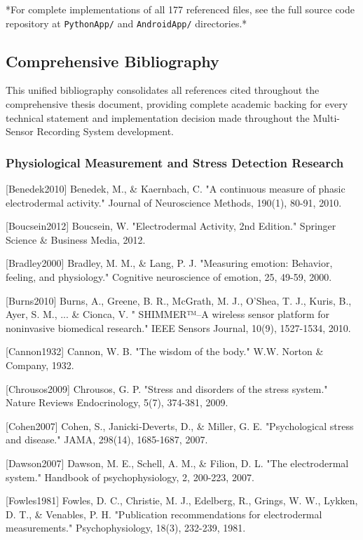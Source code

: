 \documentclass[12pt,a4paper]{report}
\begin{document}
{{*For complete implementations of all 177 referenced files, see the full source code repository at \texttt{PythonApp/}
and \texttt{AndroidApp/} directories.*

\subsection{Comprehensive Bibliography}

This unified bibliography consolidates all references cited throughout the comprehensive thesis document, providing
complete academic backing for every technical statement and implementation decision made throughout the Multi-Sensor
Recording System development.

\subsubsection{Physiological Measurement and Stress Detection Research}

[Benedek2010] Benedek, M., \& Kaernbach, C. "A continuous measure of phasic electrodermal activity." Journal of
Neuroscience Methods, 190(1), 80-91, 2010.

[Boucsein2012] Boucsein, W. "Electrodermal Activity, 2nd Edition." Springer Science \& Business Media, 2012.

[Bradley2000] Bradley, M. M., \& Lang, P. J. "Measuring emotion: Behavior, feeling, and physiology." Cognitive
neuroscience of emotion, 25, 49-59, 2000.

[Burns2010] Burns, A., Greene, B. R., McGrath, M. J., O'Shea, T. J., Kuris, B., Ayer, S. M., ... \& Cionca, V. "
SHIMMER™–A wireless sensor platform for noninvasive biomedical research." IEEE Sensors Journal, 10(9), 1527-1534, 2010.

[Cannon1932] Cannon, W. B. "The wisdom of the body." W.W. Norton \& Company, 1932.

[Chrousos2009] Chrousos, G. P. "Stress and disorders of the stress system." Nature Reviews Endocrinology, 5(7), 374-381,
2009.

[Cohen2007] Cohen, S., Janicki‐Deverts, D., \& Miller, G. E. "Psychological stress and disease." JAMA, 298(14),
1685-1687, 2007.

[Dawson2007] Dawson, M. E., Schell, A. M., \& Filion, D. L. "The electrodermal system." Handbook of psychophysiology, 2,
200-223, 2007.

[Fowles1981] Fowles, D. C., Christie, M. J., Edelberg, R., Grings, W. W., Lykken, D. T., \& Venables, P. H. "Publication
recommendations for electrodermal measurements." Psychophysiology, 18(3), 232-239, 1981.

}}
\end{document}
